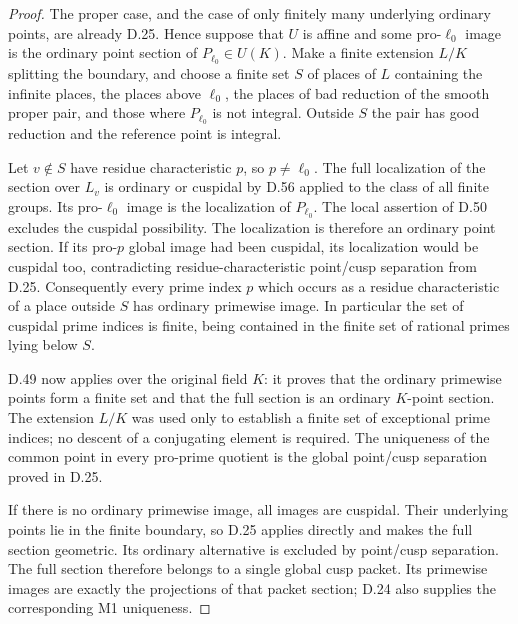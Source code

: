 \begin{proof}
The proper case, and the case of only finitely
many underlying ordinary points, are already
D.25. Hence suppose that \(U\) is affine
and some pro-\(\ell_0\) image is the ordinary
point section of \(P_{\ell_0}\in U(K)\).
Make a finite extension \(L/K\) splitting
the boundary, and choose a finite set \(S\)
of places of \(L\) containing the infinite
places, the places above \(\ell_0\), the
places of bad reduction of the smooth
proper pair, and those where
\(P_{\ell_0}\) is not integral.
Outside \(S\) the pair has good reduction
and the reference point is integral.

Let \(v\notin S\) have residue characteristic
\(p\), so \(p\ne\ell_0\).
The full localization of the section over
\(L_v\) is ordinary or cuspidal by D.56
applied to the class of all finite groups. Its pro-\(\ell_0\) image
is the localization of \(P_{\ell_0}\).
The local assertion of D.50 excludes the
cuspidal possibility. The localization is
therefore an ordinary point section.
If its pro-\(p\) global image had been
cuspidal, its localization would be
cuspidal too, contradicting residue-characteristic
point/cusp separation from D.25.
Consequently every prime index \(p\)
which occurs as a residue characteristic
of a place outside \(S\) has ordinary
primewise image. In particular the set
of cuspidal prime indices is finite,
being contained in the finite set of
rational primes lying below \(S\).

D.49 now applies over the original field
\(K\): it proves that the ordinary primewise
points form a finite set and that the full
section is an ordinary \(K\)-point section.
The extension \(L/K\) was used only to
establish a finite set of exceptional
prime indices; no descent of a conjugating
element is required. The uniqueness of
the common point in every pro-prime
quotient is the global point/cusp
separation proved in D.25.

If there is no ordinary primewise image,
all images are cuspidal. Their underlying
points lie in the finite boundary, so
D.25 applies directly and makes the full
section geometric. Its ordinary alternative
is excluded by point/cusp separation.
The full section therefore belongs to a
single global cusp packet. Its primewise
images are exactly the projections of that
packet section; D.24 also supplies the
corresponding M1 uniqueness.
\end{proof}

